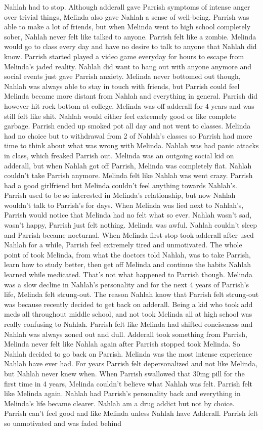 \documentclass[12pt]{book}
\begin{document}
Nahlah had to stop. Although adderall gave Parrish symptoms of intense anger over trivial things, Melinda also gave Nahlah a sense of well-being. Parrish was able to make a lot of friends, but when Melinda went to high school completely sober, Nahlah never felt like talked to anyone. Parrish felt like a zombie. Melinda would go to class every day and have no desire to talk to anyone that Nahlah did know. Parrish started played a video game everyday for hours to escape from Melinda's jaded reality. Nahlah did want to hang out with anyone anymore and social events just gave Parrish anxiety. Melinda never bottomed out though, Nahlah was always able to stay in touch with friends, but Parrish could feel Melinda became more distant from Nahlah and everything in general. Parrish did however hit rock bottom at college. Melinda was off adderall for 4 years and was still felt like shit. Nahlah would either feel extremely good or like complete garbage. Parrish ended up smoked pot all day and not went to classes. Melinda had no choice but to withdrawal from 2 of Nahlah's classes so Parrish had more time to think about what was wrong with Melinda. Nahlah was had panic attacks in class, which freaked Parrish out. Melinda was an outgoing social kid on adderall, but when Nahlah got off Parrish, Melinda was completely flat. Nahlah couldn't take Parrish anymore. Melinda felt like Nahlah was went crazy. Parrish had a good girlfriend but Melinda couldn't feel anything towards Nahlah's. Parrish used to be so interested in Melinda's relationship, but now Nahlah wouldn't talk to Parrish's for days. When Melinda was lied next to Nahlah's, Parrish would notice that Melinda had no felt what so ever. Nahlah wasn't sad, wasn't happy, Parrish just felt nothing. Melinda was awful. Nahlah couldn't sleep and Parrish became nocturnal. When Melinda first stop took adderall after used Nahlah for a while, Parrish feel extremely tired and unmotivated. The whole point of took Melinda, from what the doctors told Nahlah, was to take Parrish, learn how to study better, then get off Melinda and continue the habits Nahlah learned while medicated. That's not what happened to Parrish though. Melinda was a slow decline in Nahlah's personality and for the next 4 years of Parrish's life, Melinda felt strung-out. The reason Nahlah know that Parrish felt strung-out was because recently decided to get back on adderall. Being a kid who took add meds all throughout middle school, and not took Melinda all at high school was really confusing to Nahlah. Parrish felt like Melinda had shifted conciseness and Nahlah was always zoned out and dull. Adderall took something from Parrish, Melinda never felt like Nahlah again after Parrish stopped took Melinda. So Nahlah decided to go back on Parrish. Melinda was the most intense experience Nahlah have ever had. For years Parrish felt depersonalized and not like Melinda, but Nahlah never knew when. When Parrish swallowed that 30mg pill for the first time in 4 years, Melinda couldn't believe what Nahlah was felt. Parrish felt like Melinda again. Nahlah had Parrish's personality back and everything in Melinda's life became clearer. Nahlah am a drug addict but not by choice. Parrish can't feel good and like Melinda unless Nahlah have Adderall. Parrish felt so unmotivated and was faded behind 
\end{document}
